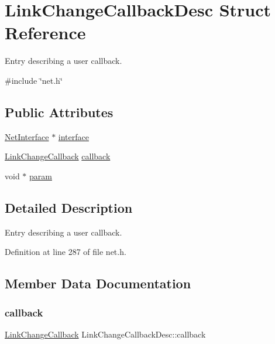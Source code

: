 \hypertarget{structLinkChangeCallbackDesc}{}\section{Link\+Change\+Callback\+Desc Struct Reference}
\label{structLinkChangeCallbackDesc}


Entry describing a user callback.  




{\ttfamily \#include \char`\"{}net.\+h\char`\"{}}

\subsection*{Public Attributes}
\begin{DoxyCompactItemize}
\item 
\hyperlink{net_8h_a2234db8911a1148c9159979d8f5e0d6b}{Net\+Interface} $\ast$ \hyperlink{structLinkChangeCallbackDesc_adc36a3ad331a45c3bde009cc476bd559}{interface}
\item 
\hyperlink{net_8h_a58f78b4ded73c4a27994b9a31b2ed0aa}{Link\+Change\+Callback} \hyperlink{structLinkChangeCallbackDesc_a1ba4a8df84d49e9817ea124d6e3f76e9}{callback}
\item 
void $\ast$ \hyperlink{structLinkChangeCallbackDesc_a109ef09876fabae6dad4286d1a105a00}{param}
\end{DoxyCompactItemize}


\subsection{Detailed Description}
Entry describing a user callback. 

Definition at line 287 of file net.\+h.



\subsection{Member Data Documentation}
\mbox{\label{structLinkChangeCallbackDesc_a1ba4a8df84d49e9817ea124d6e3f76e9}} 
\subsubsection{\texorpdfstring{callback}{callback}}
{\footnotesize\ttfamily \hyperlink{net_8h_a58f78b4ded73c4a27994b9a31b2ed0aa}{Link\+Change\+Callback} Link\+Change\+Callback\+Desc\+::callback}



